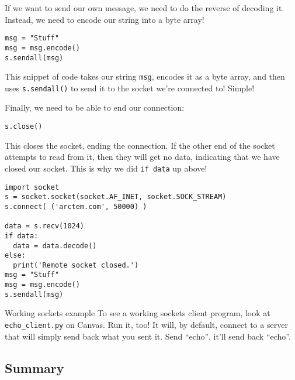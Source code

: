 \documentclass[11pt]{cselabheader}
\begin{document}
If we want to send our own message, we need to do the reverse of decoding it.
Instead, we need to encode our string into a byte array!

\begin{lstlisting}
msg = "Stuff"
msg = msg.encode()
s.sendall(msg)
\end{lstlisting}

This snippet of code takes our string \lstinline{msg}, encodes it as a byte
array, and then uses \lstinline{s.sendall()} to send it to the socket we're
connected to! Simple!

Finally, we need to be able to end our connection:

\begin{lstlisting}
s.close()
\end{lstlisting}

This closes the socket, ending the connection. If the other end of the socket
attempts to read from it, then they will get no data, indicating that we have
closed our socket. This is why we did \lstinline{if data} up above!

\begin{lstlisting}[style=python,label={lst:sock},caption={Code that shows usage, but does not
actually make sense}]
import socket
s = socket.socket(socket.AF_INET, socket.SOCK_STREAM)
s.connect( ('arctem.com', 50000) )

data = s.recv(1024)
if data:
  data = data.decode()
else:
  print('Remote socket closed.')
msg = "Stuff"
msg = msg.encode()
s.sendall(msg)
\end{lstlisting}


\begin{warningbox}{Working sockets example}
  To see a working sockets client program, look at
  \texttt{echo\_client.py} on Canvas. Run it, too! It will, by default, connect
  to a server that will simply send back what you sent it. Send ``echo'', it'll
  send back ``echo''.
\end{warningbox}

\pagebreak
\subsection{Summary}
\end{document}
